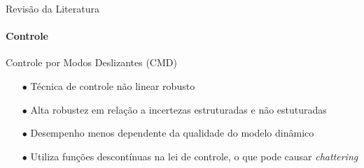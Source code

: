 \documentclass[25pt,landscape]{beamer}
\begin{document}
\begin{frame}{Revisão da Literatura}
    \framesubtitle{Controle}
    \begin{block}{Controle por Modos Deslizantes (CMD)}
        \begin{itemize}
            \item[$\bullet$] Técnica de controle não linear robusto \\[8pt]
            \item[$\bullet$] Alta robustez em relação a incertezas estruturadas e não estuturadas \\[8pt]
            \item[$\bullet$] Desempenho menos dependente da qualidade do modelo dinâmico \\[8pt]
            \item[$\bullet$] Utiliza funções descontínuas na lei de controle, o que pode causar \emph{chattering} \\[8pt]
        \end{itemize}
    \end{block}
\end{frame}









\end{document}
